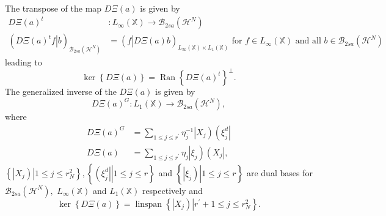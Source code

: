 \documentclass[aps,preprint]{revtex4}%
\begin{document}
The transpose of the map $D\Xi\left(  a\right)  $ is given by
\begin{align}
D\Xi\left(  a\right)  ^{t}  &  :L_{\infty}\left(  \mathbb{X}\right)
\rightarrow\mathcal{B}_{2sa}\left(  \mathcal{H}^{N}\right) \nonumber\\
\left(  \overset{}{D\Xi\left(  a\right)  ^{t}f}\left\vert \overset{}%
{b}\right.  \right)  _{\mathcal{B}_{2sa}\left(  \mathcal{H}^{N}\right)  }  &
=\left(  \overset{}{f}\left\vert \overset{}{D\Xi\left(  a\right)  b}\right.
\right)  _{L_{\infty}\left(  \mathbb{X}\right)  \times L_{1}\left(
\mathbb{X}\right)  }\text{ for }f\in L_{\infty}\left(  \mathbb{X}\right)
\text{ and all }b\in\mathcal{B}_{2sa}\left(  \mathcal{H}^{N}\right)
\end{align}
leading to
\begin{equation}
\ker\left\{  D\Xi\left(  a\right)  \right\}  =\operatorname{Ran}\left\{
D\Xi\left(  a\right)  ^{t}\right\}  ^{\bot}.
\end{equation}
The generalized inverse of the $D\Xi\left(  a\right)  $ is given by
\begin{equation}
D\Xi\left(  a\right)  ^{G}:L_{1}\left(  \mathbb{X}\right)  \rightarrow
\mathcal{B}_{2sa}\left(  \mathcal{H}^{N}\right)  ,
\end{equation}
where
\begin{align}
D\Xi\left(  a\right)  ^{G}  &  =\sum_{1\leq j\leq r^{\prime}}\eta_{j}%
^{-1}\left\vert X_{j}\right)  \left(  \xi_{j}^{d}\right\vert \\
D\Xi\left(  a\right)   &  =\sum_{1\leq j\leq r^{\prime}}\eta_{j}\left\vert
\xi_{j}\right)  \left(  X_{j}\right\vert ,
\end{align}
$\left\{  \left.  \left\vert X_{j}\right)  \right\vert 1\leq j\leq r_{N}%
^{2}\right\}  ,\left\{  \left.  \left(  \xi_{j}^{d}\right\vert \right\vert
1\leq j\leq r\right\}  $ and $\left\{  \left.  \left\vert \xi_{j}\right)
\right\vert 1\leq j\leq r\right\}  $ are dual bases for $\mathcal{B}%
_{2sa}\left(  \mathcal{H}^{N}\right)  ,$ $L_{\infty}\left(  \mathbb{X}\right)
$ and $L_{1}\left(  \mathbb{X}\right)  $ respectively and
\begin{equation}
\ker\left\{  D\Xi\left(  a\right)  \right\}  =\operatorname{linspan}\left\{
\left.  \left\vert \overset{}{X_{j}}\right)  \right\vert r^{\prime}+1\leq
j\leq r_{N}^{2}\right\}  .
\end{equation}
\end{document}
